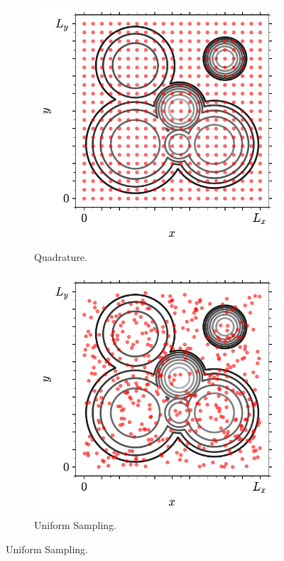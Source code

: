 \begin{figure}[bt]
     \centering
     
     \begin{subfigure}[b]{0.45\textwidth}
         \centering
         \includegraphics[width=\textwidth]{./figures/methods/mc_2d_quad.pdf}
         \caption{Quadrature.}
         \label{fig:montecarloint1}
     \end{subfigure}
     \hfill
     \begin{subfigure}[b]{0.45\textwidth}
         \centering
         \includegraphics[width=\textwidth]{./figures/methods/mc_2d_rand.pdf}
         \caption{Uniform Sampling.}
         \label{fig:montecarloint2}
     \end{subfigure}
     \hfill
     

\end{figure}
